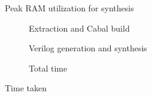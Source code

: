 \begin{figure}
  \begin{center}
    
    \caption{Peak RAM utilization for synthesis}
    \label{graph:yosys-ram}
  \end{center}
\end{figure}



\begin{figure}
\begin{subfigure}{1.0\linewidth}
  \begin{center}
    
    \caption{Extraction and Cabal build}
    \label{graph:time-build-extr}
  \end{center}
\end{subfigure}

\begin{subfigure}{1.0\linewidth}
  \begin{center}
    
    \caption{Verilog generation and synthesis}
    \label{graph:time-hdl-synth}
  \end{center}
\end{subfigure}

\begin{subfigure}{1.0\linewidth}
  \begin{center}
    
  \caption{Total time}
  \label{graph:time-taken}
  \end{center}
\end{subfigure}
  \caption{Time taken}
  \label{graph:time}
\end{figure}

